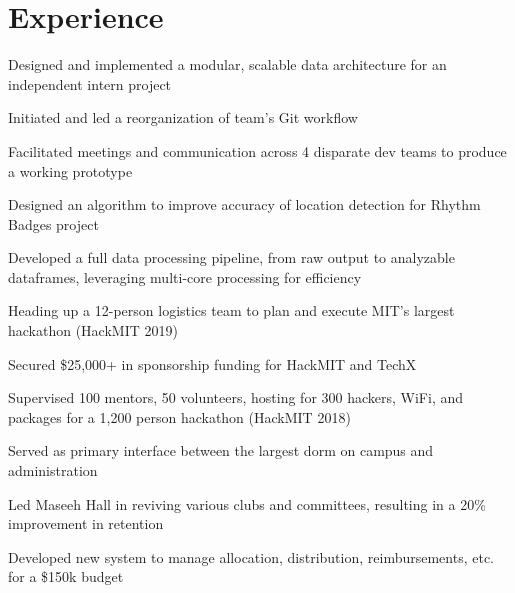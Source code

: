 \documentclass[]{deedy-resume-openfont}
\begin{document}
\section{Experience}
\hfill {}
\begin{tightemize}
    \item Designed and implemented a modular, scalable data architecture for an independent intern project
    \item Initiated and led a reorganization of team's Git workflow
    \item Facilitated meetings and communication across 4 disparate dev teams to produce a working prototype
\end{tightemize}
\sectionsep
{}\hfill {}
\begin{tightemize}
	\item Designed an algorithm to improve accuracy of location detection for Rhythm Badges project
	\item Developed a full data processing pipeline, from raw output to analyzable dataframes, leveraging multi-core processing for efficiency
\end{tightemize}
\sectionsep
{}\hfill {}
\begin{tightemize}
    \item Heading up a 12-person logistics team to plan and execute MIT's largest hackathon (HackMIT 2019)
	\item Secured \$25,000+ in sponsorship funding for HackMIT and TechX
    \item Supervised 100 mentors, 50 volunteers, hosting for 300 hackers, WiFi, and packages for a 1,200 person hackathon (HackMIT 2018)
\end{tightemize}
\sectionsep
{}\hfill {}
\begin{tightemize}
    \item Served as primary interface between the largest dorm on campus and administration
    \item Led Maseeh Hall in reviving various clubs and committees, resulting in a 20\% improvement in retention
	\item Developed new system to manage allocation, distribution, reimbursements, etc. for a \$150k budget
\end{tightemize}
\sectionsep
\end{document}
